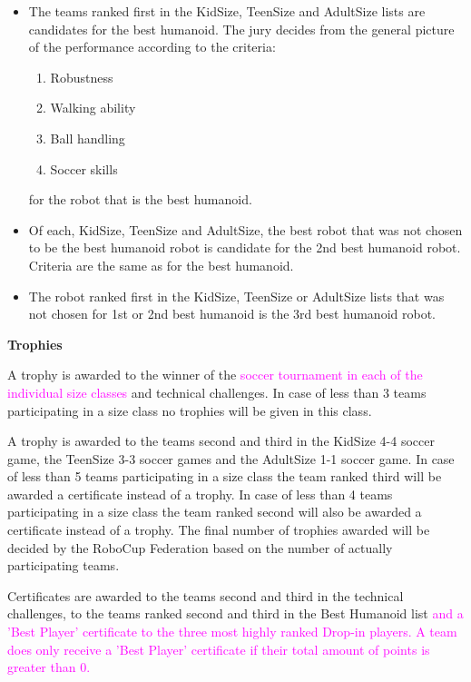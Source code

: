 \begin{itemize}
\item The teams ranked first in the KidSize, TeenSize and AdultSize lists are candidates for the best humanoid. The jury decides from the general picture of the performance according to the criteria:
\begin{enumerate}
\item Robustness
\item Walking ability
\item Ball handling
\item Soccer skills
\end{enumerate}
for the robot that is the best humanoid.
\item Of each, KidSize, TeenSize and AdultSize, the best robot that was not chosen to be the best humanoid robot is candidate for the 2nd best humanoid robot. Criteria are the same as for the best humanoid.
\item The robot ranked first in the KidSize, TeenSize or AdultSize lists that was not chosen for 1st or 2nd best humanoid is the 3rd best humanoid robot.
\end{itemize}

\bigskip

{\bfseries Trophies}

\headlinebox

A trophy is awarded to the winner of the \textcolor{magenta}{soccer tournament in each of the individual size classes} and technical challenges. In case of less than 3 teams participating in a size class no trophies will be given in this class.

\bigskip

A trophy is awarded to the teams second and third in the KidSize 4-4 soccer game, the TeenSize 3-3 soccer games and the AdultSize 1-1 soccer game. In case of less than 5 teams participating in a size class the team ranked third will be awarded a certificate instead of a trophy. In case of less than 4 teams participating in a size class the team ranked second will also be awarded a certificate instead of a trophy. The final number of trophies awarded will be decided by the RoboCup Federation based on the number of actually participating teams.

\bigskip

Certificates are awarded to the teams second and third in the technical challenges, to the teams ranked second and third in the Best Humanoid list \textcolor{magenta}{and a 'Best Player' certificate to the three most highly ranked Drop-in players. A team does only receive a 'Best Player' certificate if their total amount of points is greater than 0.}

